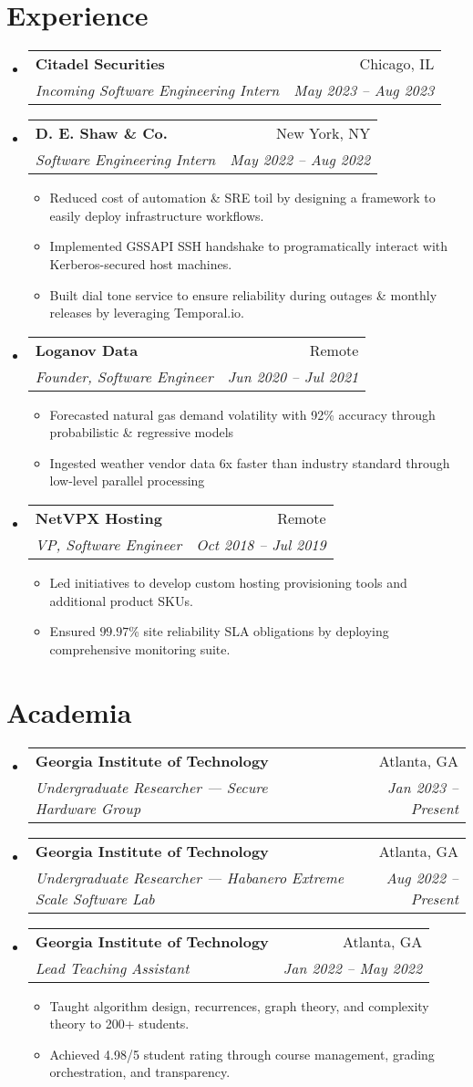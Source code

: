 \documentclass[a4paper,11pt]{extarticle}
\makeatletter
\newcommand{\resumeItem}[1]{
	\item\small{
		#1 \vspace{-1.2pt}
	}
}
\newcommand{\resumeSubheading}[4]{
	\vspace{-1pt}
    \item
		\begin{tabular*}{1\linewidth}{l@{\extracolsep{\fill}}r}
			\textbf{#1} & #2 \\
			\textit{#3} & \textit{#4} \\
		\end{tabular*}\vspace{-2pt}
}
\newcommand{\resumeSubHeadingListStart}{
    \begin{itemize}[leftmargin=0.15in,label={}]}
\newcommand{\resumeSubHeadingListEnd}{\end{itemize}}
\newcommand{\resumeItemListStart}{\begin{itemize}\vspace{-3pt}}
\newcommand{\resumeItemListEnd}{\end{itemize}\vspace{-3pt}}
\makeatother
\begin{document}
\section{Experience}
	\resumeSubHeadingListStart
        \resumeSubheading
            {Citadel Securities}
            {Chicago, IL}
            {Incoming Software Engineering Intern}
            {May 2023 -- Aug 2023}
        \resumeSubheading
            {D. E. Shaw \& Co.}
            {New York, NY}
            {Software Engineering Intern}
            {May 2022 -- Aug 2022}
		\resumeItemListStart
            \resumeItem{Reduced cost of automation \& SRE toil by
                designing a framework to easily deploy infrastructure
                workflows.}
            \resumeItem{Implemented GSSAPI SSH handshake to programatically
                interact with Kerberos-secured host machines.}
            \resumeItem{Built dial tone service to ensure reliability during
                outages \& monthly releases by leveraging Temporal.io.}
		\resumeItemListEnd
		\resumeSubheading
            {Loganov Data}
            {Remote}
		    {Founder, Software Engineer}
            {Jun 2020 -- Jul 2021}
		\resumeItemListStart
			\resumeItem{Forecasted natural gas demand volatility with 92\%
                accuracy through probabilistic \& regressive models}
			\resumeItem{Ingested weather vendor data 6x faster than industry
				standard through low-level parallel processing}
		\resumeItemListEnd
		\resumeSubheading
            {NetVPX Hosting}
            {Remote}
		    {VP, Software Engineer}
            {Oct 2018 -- Jul 2019}
		\resumeItemListStart
			\resumeItem{Led initiatives to develop custom hosting provisioning
				tools and additional product SKUs.}
			\resumeItem{Ensured $99.97$\% site reliability SLA obligations
                by deploying comprehensive monitoring suite.}
		\resumeItemListEnd
	\resumeSubHeadingListEnd

\section{Academia}
	\resumeSubHeadingListStart
        \resumeSubheading
            {Georgia Institute of Technology}
            {Atlanta, GA}
            {Undergraduate Researcher --- Secure Hardware Group}
            {Jan 2023 -- Present}
        \resumeSubheading
            {Georgia Institute of Technology}
            {Atlanta, GA}
            {Undergraduate Researcher --- Habanero Extreme Scale Software Lab}
            {Aug 2022 -- Present}
        \resumeSubheading
            {Georgia Institute of Technology}
            {Atlanta, GA}
            {Lead Teaching Assistant}
            {Jan 2022 -- May 2022}
		\resumeItemListStart
			\resumeItem{Taught algorithm design, recurrences, graph
            theory, and complexity theory to 200+ students.}
            \resumeItem{Achieved 4.98/5 student rating through course management,
                grading orchestration, and transparency.}
		\resumeItemListEnd
	\resumeSubHeadingListEnd
\end{document}
